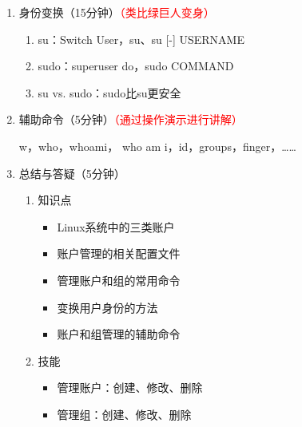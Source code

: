 \documentclass{TIJMUjiaoanLL}
\begin{document}
\begin{enumerate}
  \item 身份变换（15分钟）\textcolor{red}{（类比绿巨人变身）}
    \begin{enumerate}
      \item su：Switch User，su、su [-] USERNAME
      \item sudo：superuser do，sudo COMMAND
      \item su vs. sudo：sudo比su更安全
    \end{enumerate}

  \item 辅助命令（5分钟）\textcolor{red}{（通过操作演示进行讲解）}

    w，who，whoami， who am i，id，groups，finger，……

  \item 总结与答疑（5分钟）
    \begin{enumerate}
      \item 知识点
	\begin{itemize}
	  \item Linux系统中的三类账户
	  \item 账户管理的相关配置文件
	  \item 管理账户和组的常用命令
	  \item 变换用户身份的方法
	  \item 账户和组管理的辅助命令
	\end{itemize}
      \item 技能
	\begin{itemize}
	  \item 管理账户：创建、修改、删除
	  \item 管理组：创建、修改、删除
	\end{itemize}
    \end{enumerate}

\end{enumerate}

\otherTail
\end{document}
